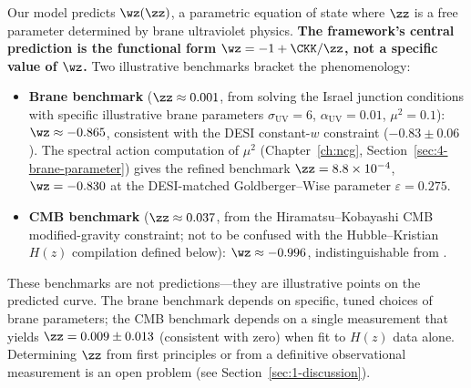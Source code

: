 Our model predicts $\wz(\zz)$, a parametric equation of state where $\zz$ is a free parameter determined by brane ultraviolet physics. \textbf{The framework's central prediction is the functional form $\wz = -1 + \CKK/\zz$, not a specific value of $\wz$.} Two illustrative benchmarks bracket the phenomenology:
\begin{itemize}
\item \textbf{Brane benchmark} ($\zz \approx 0.001$, from solving the Israel junction conditions with specific illustrative brane parameters $\sigma_\mathrm{UV} = 6$, $\alpha_\mathrm{UV} = 0.01$, $\mu^2 = 0.1$): $\wz \approx -0.865$, consistent with the DESI constant-$w$ constraint ($-0.83 \pm 0.06$). The spectral action computation of $\mu^2$ (Chapter~\ref{ch:ncg}, Section~\ref{sec:4-brane-parameter}) gives the refined benchmark $\zz = 8.8 \times 10^{-4}$, $\wz = -0.830$ at the DESI-matched Goldberger--Wise parameter $\varepsilon = 0.275$.
\item \textbf{CMB benchmark} ($\zz \approx 0.037$, from the Hiramatsu--Kobayashi CMB modified-gravity constraint; not to be confused with the Hubble--Kristian $H(z)$ compilation defined below): $\wz \approx -0.996$, indistinguishable from \LCDM.
\end{itemize}
These benchmarks are not predictions---they are illustrative points on the predicted curve. The brane benchmark depends on specific, tuned choices of brane parameters; the CMB benchmark depends on a single measurement that yields $\zz = 0.009 \pm 0.013$ (consistent with zero) when fit to $H(z)$ data alone. Determining $\zz$ from first principles or from a definitive observational measurement is an open problem (see Section~\ref{sec:1-discussion}).

\bigskip
\noindent{}\bigskip

